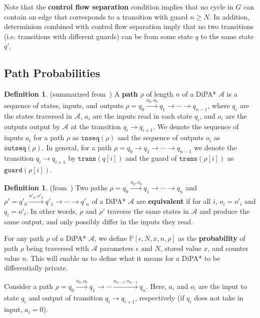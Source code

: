\documentclass[12pt]{article}
\newcommand{\PP}{\mathbb{P}}
\theoremstyle{definition}
\newtheorem{defn}[thm]{Definition}
\begin{document}
Note that the \textbf{control flow separation} condition implies that no cycle in $G$ can contain an edge that corresponds to a transition with guard $n\geq N$. In addition, determinism combined with control flow separation imply that no two transitions (i.e. transitions with different guards) can be from some state $q$ to the same state $q'$. 

\subsection{Path Probabilities}


\begin{defn} (summarized from~\cite{chadhaLinearTimeDecidability2021})
	A \textbf{path} $\rho$ of length $n$ of a DiPA* $\mathcal{A}$ is a sequence of states, inputs, and outputs $\rho = q_0\xrightarrow{a_0, o_0} q_1\to\cdots \to q_{n-1}$, where $q_i$ are the states traversed in $\mathcal{A}$, $a_i$ are the inputs read in each state $q_i$, and $o_i$ are the outputs output by $\mathcal{A}$ at the transition $q_i\to q_{i+1}$. 
	We denote the sequence of inputs $a_i$ for a path $\rho$ as $\texttt{inseq}(\rho)$ and the sequence of outputs $o_i$ as $\texttt{outseq}(\rho)$. In general, for a path $\rho = q_0\to q_1\to \cdots \to q_{n-1}$ we denote the transition $q_i\to q_{i+1}$ by $\texttt{trans}(q[i])$ and the guard of $\texttt{trans}(\rho[i])$ as $\texttt{guard}(\rho[i])$.
\end{defn}

\begin{defn} (from~\cite{chadhaLinearTimeDecidability2021})
	Two paths $\rho = q_0\xrightarrow{a_0, o_0} q_1\to\cdots \to q_n$ and $\rho' = q'_0 \xrightarrow{a'_0, o'_0} q'_1 \to \cdots \to q'_n$ of a DiPA* $\mathcal{A}$ are \textbf{equivalent} if for all $i$, $o_i = o'_i$ and $q_i = o'_i$. In other words, $\rho$ and $\rho'$ traverse the same states in $\mathcal{A}$ and produce the same output, and only possibly differ in the inputs they read. 
\end{defn}



For any path $\rho$ of a DiPA* $\mathcal{A}$, we define $\PP[\epsilon, N, x, n, \rho]$ as the \textbf{probability} of path $\rho$ being traversed with $\mathcal{A}$ parameters $\epsilon$ and $N$, stored value $x$, and counter value $n$. This will enable us to define what it means for a DiPA* to be differentially private.

Consider a path $\rho = q_0\xrightarrow[]{a_0, o_0}q_1\rightarrow\cdots\xrightarrow[]{a_{n-1}, o_{n-1}} q_n$. Here, $a_i$ and $o_i$ are the input to state $q_i$ and output of transition $q_i\to q_{i+1}$, respectively (if $q_i$ does not take in input, $a_i = 0$).
\end{document}
